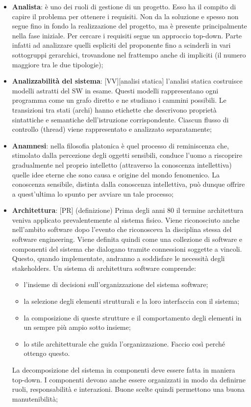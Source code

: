 \begin{itemize}
	\item \textbf{Analista}: è uno dei ruoli di gestione di un progetto. Esso ha il compito di capire il problema per ottenere i requisiti. Non da la soluzione e spesso non segue fino in fondo la realizzazione del progetto, ma è presente principalmente nella fase iniziale. \newline
	Per cercare i requisiti segue un approccio top-down. Parte infatti ad analizzare quelli espliciti del proponente fino a scinderli in vari sottogruppi gerarchici, trovandone nel frattempo anche di impliciti (il numero maggiore tra le due tipologie);

	\item \textbf{Analizzabilità del sistema}: [VV][analisi statica] l'analisi statica costruisce modelli astratti del SW in esame. Questi modelli rappresentano ogni programma come un grafo diretto e ne studiano i cammini possibili. Le transizioni tra stati (archi) hanno etichette che descrivono proprietà sintattiche e semantiche dell'istruzione corrispondente. Ciascun flusso di controllo (thread) viene rappresentato e analizzato separatamente;

	\item \textbf{Anamnesi}: nella filosofia platonica è quel processo di reminiscenza che, stimolato dalla percezione degli oggetti sensibili, conduce l'uomo a riscoprire gradualmente nel proprio intelletto (attraverso la conoscenza intellettiva) quelle idee eterne che sono causa e origine del mondo fenomenico. La conoscenza sensibile, distinta dalla conoscenza intellettiva, può dunque offrire a quest'ultima lo spunto per avviare un tale processo;

	\item \textbf{Architettura}: [PR] (definizione) Prima degli anni 80 il termine architettura veniva applicato prevalentemente al sistema fisico. Viene riconosciuto anche nell'ambito software dopo l'evento che riconosceva la disciplina stessa del software engineering. \newline
	Viene definita quindi come una collezione di software e componenti del sistema che dialogano tramite connessioni soggette a vincoli. Questo, quando implementate, andranno a soddisfare le necessità degli stakeholders. Un sistema di architettura software comprende:
		\begin{itemize}
			\item l'insieme di decisioni sull'organizzazione del sistema software;
			\item la selezione degli elementi strutturali e la loro interfaccia con il sistema;
			\item la composizione di queste strutture e il comportamento degli elementi in un sempre più ampio sotto insieme;
			\item lo stile architetturale che guida l'organizzazione. Faccio così perché ottengo questo.
		\end{itemize}
		\noindent
	La decomposizione del sistema in componenti deve essere fatta in maniera top-down. I componenti devono anche essere organizzati in modo da definirne ruoli, responsabilità e interazioni. Buone scelte quindi permettono una buona manutenibilità;


\end{itemize}
